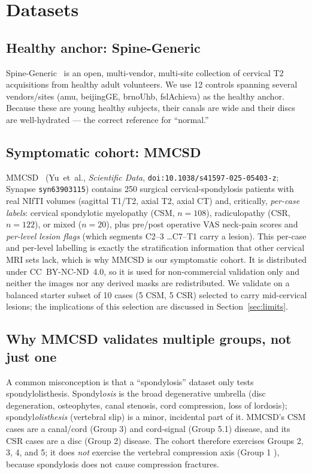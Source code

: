 \section{Datasets}
\label{sec:data}

\subsection{Healthy anchor: Spine-Generic}
Spine-Generic~\cite{spinegeneric} is an open, multi-vendor, multi-site collection of cervical T2
acquisitions from healthy adult volunteers. We use 12 controls spanning several vendors/sites (amu,
beijingGE, brnoUhb, fslAchieva) as the healthy anchor. Because these are young healthy subjects, their
canals are wide and their discs are well-hydrated --- the correct reference for ``normal.''

\subsection{Symptomatic cohort: MMCSD}
MMCSD~\cite{mmcsd} (Yu~et~al., \emph{Scientific Data}, \texttt{doi:10.1038/s41597-025-05403-z}; Synapse
\texttt{syn63903115}) contains 250 surgical cervical-spondylosis patients with real NIfTI volumes
(sagittal T1/T2, axial T2, axial CT) and, critically, \emph{per-case labels}: cervical spondylotic
myelopathy (CSM, $n=108$), radiculopathy (CSR, $n=122$), or mixed ($n=20$), plus pre/post operative VAS
neck-pain scores and \emph{per-level lesion flags} (which segments C2--3 \ldots C7--T1 carry a lesion).
This per-case and per-level labelling is exactly the stratification information that other cervical MRI
sets lack, which is why MMCSD is our symptomatic cohort. It is distributed under CC~BY-NC-ND~4.0, so it
is used for non-commercial validation only and neither the images nor any derived masks are redistributed.
We validate on a balanced starter subset of 10 cases (5 CSM, 5 CSR) selected to carry mid-cervical
lesions; the implications of this selection are discussed in Section~\ref{sec:limits}.

\subsection{Why MMCSD validates multiple groups, not just one}
A common misconception is that a ``spondylosis'' dataset only tests spondylolisthesis. Spondyl\emph{osis}
is the broad degenerative umbrella (disc degeneration, osteophytes, canal stenosis, cord compression,
loss of lordosis); spondyl\emph{olisthesis} (vertebral slip) is a minor, incidental part of it. MMCSD's
CSM cases are a canal/cord (Group 3) and cord-signal (Group 5.1) disease, and its CSR cases are a disc
(Group 2) disease. The cohort therefore exercises Groups 2, 3, 4, and 5; it does \emph{not} exercise the
vertebral compression axis (Group 1 \hahp{}), because spondylosis does not cause compression fractures.

